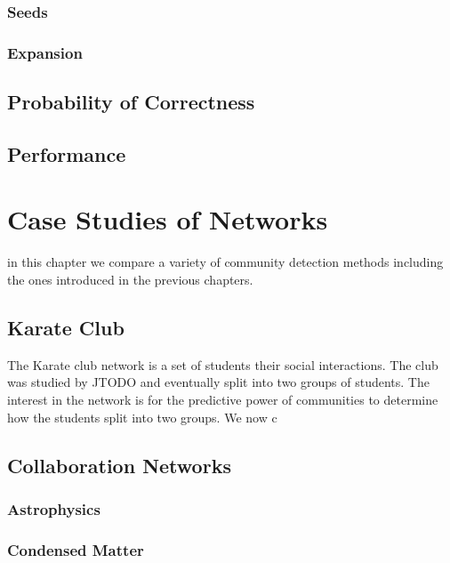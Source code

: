 \documentclass[phd,tocprelim]{cornell}
\begin{document}
\subsection{Seeds}

\subsection{Expansion}

\section{Probability of Correctness}

\section {Performance}



\chapter{Case Studies of Networks}
\label{ch:datasets}

in this chapter we compare a variety of community detection methods including the ones introduced in the previous chapters.

\section{Karate Club}
\cite{zachary}

The Karate club network is a set of students their social interactions.  The club was studied by JTODO and eventually split into two groups of students.  The interest in the network is for the predictive power of communities to determine how the students split into two groups.  We now c





\section{Collaboration Networks}


\subsection{Astrophysics}

\subsection{Condensed Matter}
\end{document}
